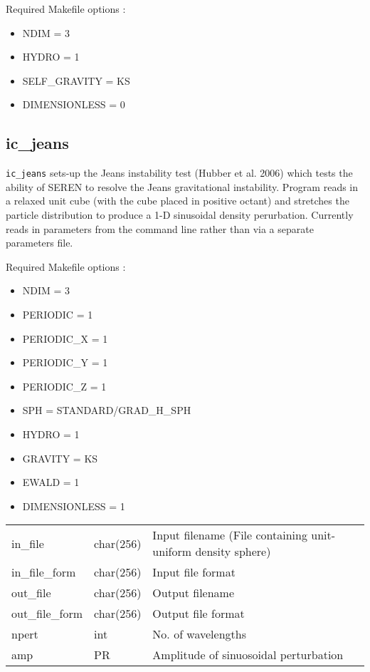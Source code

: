 \documentclass[a4paper]{article}
\newcommand{\var}[1]{\texttt{#1}}
\begin{document}
\noindent Required Makefile options :
\begin{itemize}
\item NDIM = 3
\item HYDRO = 1
\item SELF\_GRAVITY = KS
\item DIMENSIONLESS = 0
\end{itemize}

\newpage


\subsection{ic\_jeans}
\var{ic\_jeans} sets-up the Jeans instability test (Hubber et al. 2006) which tests the ability of SEREN to resolve the Jeans gravitational instability.  Program reads in a relaxed unit cube (with the cube placed in positive octant) and stretches the particle distribution to produce a 1-D sinusoidal density perurbation.  Currently reads in parameters from the command line rather than via a separate parameters file. \newline

\noindent Required Makefile options :
\begin{itemize}
\item NDIM = 3
\item PERIODIC = 1
\item PERIODIC\_X = 1
\item PERIODIC\_Y = 1
\item PERIODIC\_Z = 1
\item SPH = STANDARD/GRAD\_H\_SPH
\item HYDRO = 1
\item GRAVITY = KS
\item EWALD = 1
\item DIMENSIONLESS = 1
\end{itemize}

\vspace{0.1cm}

\begin{center}
\begin{supertabular}{|p{3cm}|p{2cm}|p{8cm}|}
in\_file         & char(256) & Input filename (File containing unit-uniform density sphere)\\
in\_file\_form   & char(256) & Input file format \\
out\_file        & char(256) & Output filename \\
out\_file\_form  & char(256) & Output file format \\
npert            & int       & No. of wavelengths \\
amp              & PR        & Amplitude of sinuosoidal perturbation \\
\end{supertabular}
\end{center}
\end{document}
